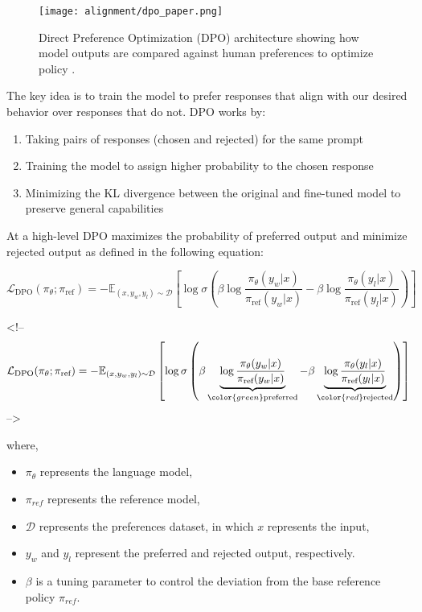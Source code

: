 \begin{figure}[H]
\centering
\texttt{[image: alignment/dpo\_paper.png]}
\caption{Direct Preference Optimization (DPO) architecture showing how model outputs are compared against human preferences to optimize policy \cite{rafailov2024directpreferenceoptimizationlanguage}.}
\label{fig:dpo-paper}
\end{figure}

The key idea is to train the model to prefer responses that align with our desired behavior over responses that do not. DPO works by:
\begin{enumerate}
\item Taking pairs of responses (chosen and rejected) for the same prompt
\item Training the model to assign higher probability to the chosen response
\item Minimizing the KL divergence between the original and fine-tuned model to preserve general capabilities
\end{enumerate}

At a high-level DPO maximizes the probability of preferred output and minimize rejected output as defined in the following equation:

\begin{equation}\label{eq:dpo}
\mathcal{L}_{\text{DPO}}(\pi_\theta; \pi_\text{ref}) = -\mathbb{E}_{(x,y_w,y_l) \sim \mathcal{D}} \left[\log \sigma \left(\beta \log \frac{\pi_\theta(y_w | x)}{\pi_\text{ref}(y_w | x)} - \beta \log \frac{\pi_\theta(y_l | x)}{\pi_\text{ref}(y_l | x)}\right)\right]
\end{equation}

<!--$$
\mathcal{L}_{\text{DPO}}(\pi_\theta; \pi_\text{ref}) = -\mathbb{E}_{(x,y_w,y_l) \sim \mathcal{D}} \left[\log \sigma \left(\beta \underbrace{\log \frac{\pi_\theta(y_w | x)}{\pi_\text{ref}(y_w | x)}}_{\color{green}\text{preferred}} - \beta \underbrace{\log \frac{\pi_\theta(y_l | x)}{\pi_\text{ref}(y_l | x)}}_{\color{red}\text{rejected}}\right)\right]
$$-->

where,
\begin{itemize}
\item $\pi_\theta$ represents the language model,
\item $\pi_{ref}$ represents the reference model,
\item $\mathcal{D}$ represents the preferences dataset, in which $x$ represents the input,
\item $y_w$ and $y_l$ represent the preferred and rejected output, respectively.
\item $\beta$ is a tuning parameter to control the deviation from the base reference policy $\pi_{ref}$.
\end{itemize}

